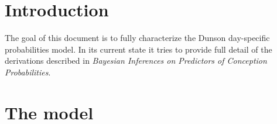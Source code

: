\documentclass[11pt]{article}
\begin{document}
\setcounter{section}{-1}
\section{Introduction}
The goal of this document is to fully characterize the Dunson day-specific probabilities model.  In its current state it tries to provide full detail of the derivations described in \textit{Bayesian Inferences on Predictors of Conception Probabilities}.




\section{The model}

\end{document}
